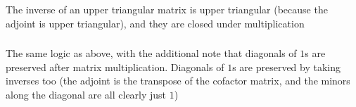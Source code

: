 \documentclass{article}
\begin{document}
\subsubsection{}\label{ex1p16}
The inverse of an upper triangular matrix is upper triangular (because the adjoint is upper triangular), and they are closed under multiplication
\subsubsection{}\label{ex1p17}
The same logic as above, with the additional note that diagonals of $1$s are preserved after matrix multiplication. Diagonals of $1$s are preserved by taking inverses too (the adjoint is the transpose of the cofactor matrix, and the minors along the diagonal are all clearly just $1$)
\end{document}
